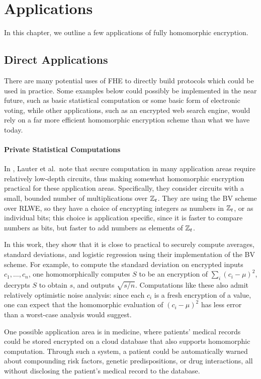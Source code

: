 \chapter{Applications} \label{chap: applications}

In this chapter, we outline a few applications of fully homomorphic encryption.



\section{Direct Applications} \label{sec: directapplication}
There are many potential uses of FHE to directly build protocols which could be used in practice. Some examples below could possibly be implemented in the near future, such as basic statistical computation or some basic form of electronic voting, while other applications, such as an encrypted web search engine, would rely on a far more efficient homomorphic encryption scheme than what we have today.

\subsubsection{Private Statistical Computations}
In \cite{bvpractical}, Lauter et al.~note that secure computation in many application areas require relatively low-depth circuits, thus making somewhat homomorphic encryption practical for these application areas. Specifically, they consider circuits with a small, bounded number of multiplications over $\mathbb{Z}_t$. They are using the BV scheme over RLWE, so they have a choice of encrypting integers as numbers in $\mathbb{Z}_t$, or as individual bits; this choice is application specific, since it is faster to compare numbers as bits, but faster to add numbers as elements of $\mathbb{Z}_t$.

In this work, they show that it is close to practical to securely compute averages, standard deviations, and logistic regression using their implementation of the BV scheme. For example, to compute the standard deviation on encrypted inputs $c_1, \dots, c_n$, one homomorphically computes $S$ to be an encryption of $\sum_i (c_i - \mu)^2$, decrypts $S$ to obtain $s$, and outputs $\sqrt{s / n}$. Computations like these also admit relatively optimistic noise analysis: since each $c_i$ is a fresh encryption of a value, one can expect that the homomorphic evaluation of $(c_i - \mu)^2$ has less error than a worst-case analysis would suggest.

One possible application area is in medicine, where patients' medical records could be stored encrypted on a cloud database that also supports homomorphic computation. Through such a system, a patient could be automatically warned about compounding risk factors, genetic predispositions, or drug interactions, all without disclosing the patient's medical record to the database.

